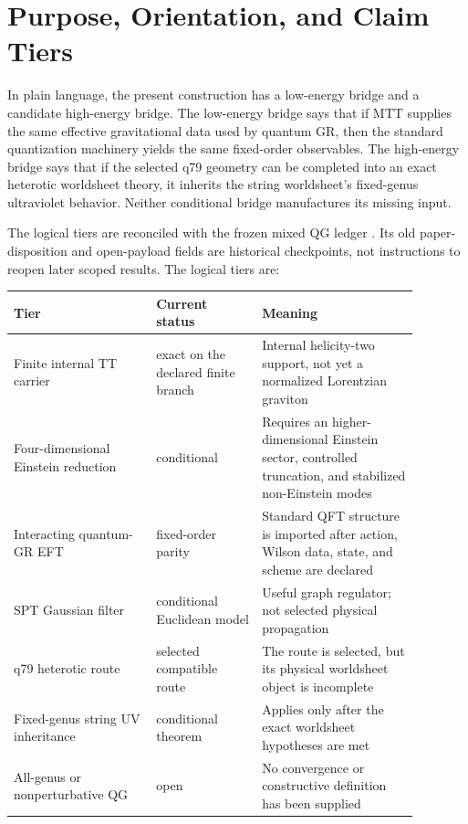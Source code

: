 \documentclass[11pt]{article}
\begin{document}
\tableofcontents

\section{Purpose, Orientation, and Claim Tiers}

In plain language, the present construction has a low-energy bridge and a
candidate high-energy bridge. The low-energy bridge says that if MTT supplies
the same effective gravitational data used by quantum GR, then the standard
quantization machinery yields the same fixed-order observables. The
high-energy bridge says that if the selected q79 geometry can be completed
into an exact heterotic worldsheet theory, it inherits the string
worldsheet's fixed-genus ultraviolet behavior. Neither conditional bridge
manufactures its missing input.

The logical tiers are reconciled with the frozen mixed QG ledger
\cite{FrozenQGStatus}. Its old paper-disposition and open-payload fields are
historical checkpoints, not instructions to reopen later scoped results.
The logical tiers are:
\begin{center}
\begin{tabular}{p{0.31\linewidth}p{0.23\linewidth}p{0.34\linewidth}}
\toprule
Tier & Current status & Meaning\\
\midrule
Finite internal TT carrier & exact on the declared finite branch &
Internal helicity-two support, not yet a normalized Lorentzian graviton\\
Four-dimensional Einstein reduction & conditional & Requires an
higher-dimensional Einstein sector, controlled truncation, and stabilized
non-Einstein modes\\
Interacting quantum-GR EFT & fixed-order parity & Standard QFT structure is
imported after action, Wilson data, state, and scheme are declared\\
SPT Gaussian filter & conditional Euclidean model & Useful graph regulator;
not selected physical propagation\\
q79 heterotic route & selected compatible route & The route is selected, but
its physical worldsheet object is incomplete\\
Fixed-genus string UV inheritance & conditional theorem & Applies only after
the exact worldsheet hypotheses are met\\
All-genus or nonperturbative QG & open & No convergence or constructive
definition has been supplied\\
\bottomrule
\end{tabular}
\end{center}
\end{document}
